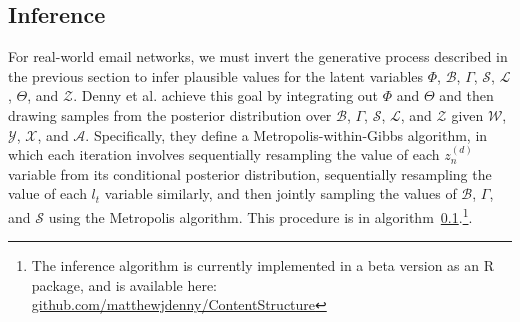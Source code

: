\documentclass{pnastwo}
\begin{document}
\begin{article}
\subsection{Inference}
For real-world email networks, we must invert the generative process
described in the previous section to infer plausible values for the
latent variables $\Phi$, $\mathcal{B}$, $\Gamma$, $\mathcal{S}$,
$\mathcal{L}$, $\Theta$, and $\mathcal{Z}$. Denny et al. achieve this
goal by integrating out $\Phi$ and $\Theta$ and then drawing samples
from the posterior distribution over $\mathcal{B}$, $\Gamma$,
$\mathcal{S}$, $\mathcal{L}$, and $\mathcal{Z}$ given $\mathcal{W}$,
$\mathcal{Y}$, $\mathcal{X}$, and $\mathcal{A}$. Specifically, they
define a Metropolis-within-Gibbs algorithm, in which each iteration
involves sequentially resampling the value of each $z_n^{(d)}$
variable from its conditional posterior distribution, sequentially
resampling the value of each $l_t$ variable similarly, and then
jointly sampling the values of $\mathcal{B}$, $\Gamma$, and
$\mathcal{S}$ using the Metropolis algorithm. This procedure is in
algorithm~\ref{}.\footnote{The inference algorithm is currently
  implemented in a beta version as an R package, and is available
  here:
  \href{https://github.com/matthewjdenny/ContentStructure}{github.com/matthewjdenny/ContentStructure}}.





\end{article}
\end{document}

